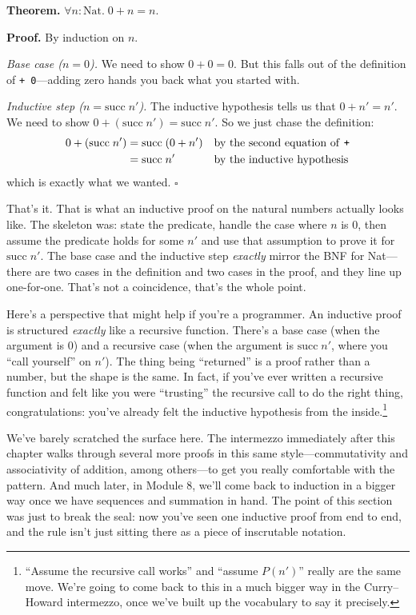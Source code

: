 \documentclass[11pt]{article}
\begin{document}
\textbf{Theorem.} $\forall n : \text{Nat}.\; 0 + n = n$.

\textbf{Proof.} By induction on $n$.

\emph{Base case ($n = 0$).} We need to show $0 + 0 = 0$. But this falls out of the definition of \texttt{+ 0}---adding zero hands you back what you started with.

\emph{Inductive step ($n = \text{succ}\; n'$).} The inductive hypothesis tells us that $0 + n' = n'$. We need to show $0 + (\text{succ}\; n') = \text{succ}\; n'$. So we just chase the definition:
\begin{align*}
0 + (\text{succ}\; n') &= \text{succ}\;(0 + n') && \text{by the second equation of \texttt{+}} \\
                       &= \text{succ}\; n'      && \text{by the inductive hypothesis}
\end{align*}
which is exactly what we wanted. \hfill$\square$

\bigskip
That's it. That is what an inductive proof on the natural numbers actually looks like. The skeleton was: state the predicate, handle the case where $n$ is $0$, then assume the predicate holds for some $n'$ and use that assumption to prove it for $\text{succ}\; n'$. The base case and the inductive step \emph{exactly} mirror the BNF for Nat---there are two cases in the definition and two cases in the proof, and they line up one-for-one. That's not a coincidence, that's the whole point.

Here's a perspective that might help if you're a programmer. An inductive proof is structured \emph{exactly} like a recursive function. There's a base case (when the argument is $0$) and a recursive case (when the argument is $\text{succ}\; n'$, where you ``call yourself'' on $n'$). The thing being ``returned'' is a proof rather than a number, but the shape is the same. In fact, if you've ever written a recursive function and felt like you were ``trusting'' the recursive call to do the right thing, congratulations: you've already felt the inductive hypothesis from the inside.\footnote{``Assume the recursive call works'' and ``assume $P(n')$'' really are the same move. We're going to come back to this in a much bigger way in the Curry--Howard intermezzo, once we've built up the vocabulary to say it precisely.}

\bigskip
We've barely scratched the surface here. The intermezzo immediately after this chapter walks through several more proofs in this same style---commutativity and associativity of addition, among others---to get you really comfortable with the pattern. And much later, in Module 8, we'll come back to induction in a bigger way once we have sequences and summation in hand. The point of this section was just to break the seal: now you've seen one inductive proof from end to end, and the rule isn't just sitting there as a piece of inscrutable notation.
\end{document}
